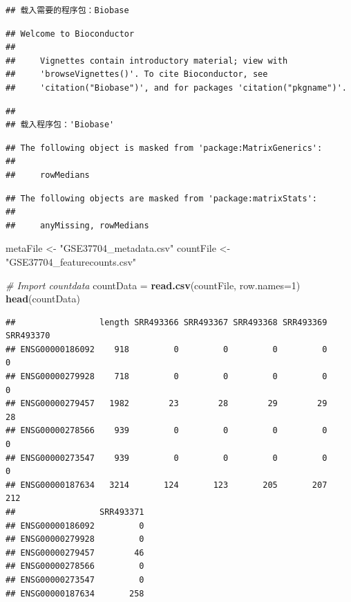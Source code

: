 \documentclass[
]{article}
\newenvironment{Shaded}{\begin{snugshade}}{\end{snugshade}}
\newcommand{\AttributeTok}[1]{\textcolor[rgb]{0.13,0.29,0.53}{#1}}
\newcommand{\CommentTok}[1]{\textcolor[rgb]{0.56,0.35,0.01}{\textit{#1}}}
\newcommand{\DecValTok}[1]{\textcolor[rgb]{0.00,0.00,0.81}{#1}}
\newcommand{\FunctionTok}[1]{\textcolor[rgb]{0.13,0.29,0.53}{\textbf{#1}}}
\newcommand{\NormalTok}[1]{#1}
\newcommand{\OtherTok}[1]{\textcolor[rgb]{0.56,0.35,0.01}{#1}}
\newcommand{\StringTok}[1]{\textcolor[rgb]{0.31,0.60,0.02}{#1}}
\begin{document}
\begin{verbatim}
## 载入需要的程序包：Biobase
\end{verbatim}

\begin{verbatim}
## Welcome to Bioconductor
## 
##     Vignettes contain introductory material; view with
##     'browseVignettes()'. To cite Bioconductor, see
##     'citation("Biobase")', and for packages 'citation("pkgname")'.
\end{verbatim}

\begin{verbatim}
## 
## 载入程序包：'Biobase'
\end{verbatim}

\begin{verbatim}
## The following object is masked from 'package:MatrixGenerics':
## 
##     rowMedians
\end{verbatim}

\begin{verbatim}
## The following objects are masked from 'package:matrixStats':
## 
##     anyMissing, rowMedians
\end{verbatim}

\begin{Shaded}
\begin{Highlighting}[]
\NormalTok{metaFile }\OtherTok{\textless{}{-}} \StringTok{"GSE37704\_metadata.csv"}
\NormalTok{countFile }\OtherTok{\textless{}{-}} \StringTok{"GSE37704\_featurecounts.csv"}

\CommentTok{\# Import countdata}
\NormalTok{countData }\OtherTok{=} \FunctionTok{read.csv}\NormalTok{(countFile, }\AttributeTok{row.names=}\DecValTok{1}\NormalTok{)}
\FunctionTok{head}\NormalTok{(countData)}
\end{Highlighting}
\end{Shaded}

\begin{verbatim}
##                 length SRR493366 SRR493367 SRR493368 SRR493369 SRR493370
## ENSG00000186092    918         0         0         0         0         0
## ENSG00000279928    718         0         0         0         0         0
## ENSG00000279457   1982        23        28        29        29        28
## ENSG00000278566    939         0         0         0         0         0
## ENSG00000273547    939         0         0         0         0         0
## ENSG00000187634   3214       124       123       205       207       212
##                 SRR493371
## ENSG00000186092         0
## ENSG00000279928         0
## ENSG00000279457        46
## ENSG00000278566         0
## ENSG00000273547         0
## ENSG00000187634       258
\end{verbatim}
\end{document}
